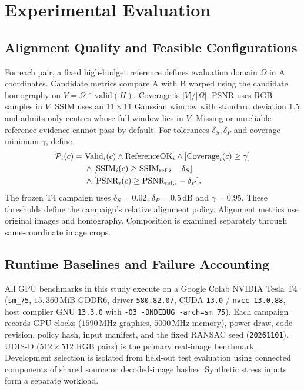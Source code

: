 \section{Experimental Evaluation}
\label{sec:experiments}
\subsection{Alignment Quality and Feasible Configurations}
\label{sec:quality}
For each pair, a fixed high-budget reference defines evaluation domain $\Omega$
in A coordinates. Candidate metrics compare A with B warped using the candidate
homography on $V=\Omega\cap\mathrm{valid}(H)$. Coverage is $|V|/|\Omega|$.
PSNR uses RGB samples in $V$. SSIM uses an $11\times11$ Gaussian window with
standard deviation 1.5 and admits only centres whose full window lies in $V$.
Missing or unreliable reference evidence cannot pass by default. For tolerances
$\delta_S,\delta_P$ and coverage minimum $\gamma$, define
\begin{align}
\mathcal P_i(c)={}&\mathrm{Valid}_i(c)\land\mathrm{ReferenceOK}_i
                   \land[\mathrm{Coverage}_i(c)\ge\gamma]\notag\\
 &{}\land[\mathrm{SSIM}_i(c)\ge\mathrm{SSIM}_{\mathrm{ref},i}-\delta_S]\notag\\
 &{}\land[\mathrm{PSNR}_i(c)\ge\mathrm{PSNR}_{\mathrm{ref},i}-\delta_P].
\end{align}
The frozen T4 campaign uses $\delta_S=0.02$, $\delta_P=0.5$\,dB and
$\gamma=0.95$. These thresholds define the campaign's relative alignment
policy. Alignment metrics use original images and homography. Composition is
examined separately through same-coordinate image crops.

\subsection{Runtime Baselines and Failure Accounting}
All GPU benchmarks in this study execute on a Google Colab NVIDIA Tesla T4
(\texttt{sm\_75}, $15{,}360$\,MiB GDDR6, driver \texttt{580.82.07}, CUDA
\texttt{13.0} / \texttt{nvcc 13.0.88}, host compiler GNU \texttt{13.3.0} with
\texttt{-O3 -DNDEBUG -arch=sm\_75}). Each campaign records GPU clocks
($1590$\,MHz graphics, $5000$\,MHz memory), power draw, code revision, policy
hash, input manifest, and the fixed RANSAC seed (\texttt{20261101}). UDIS-D
($512\times 512$ RGB pairs) is the primary real-image benchmark. Development selection
is isolated from held-out test evaluation using connected components of shared
source or decoded-image hashes. Synthetic stress inputs form a separate workload.

